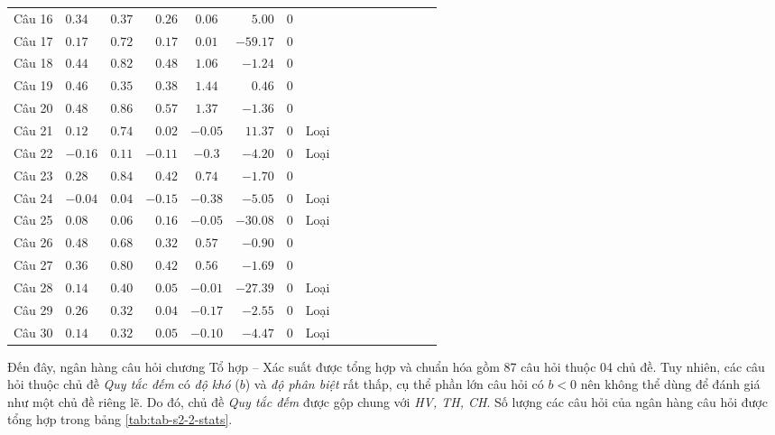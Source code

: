 \begin{longtable}{SlSrSrSrSrSrSrSc}
	Câu 16 & $0.34$  & $0.37$ & $0.26$  & $0.06$  & $5.00$   & $0$ &      \\
	Câu 17 & $0.17$  & $0.72$ & $0.17$  & $0.01$  & $-59.17$ & $0$ &      \\
	Câu 18 & $0.44$  & $0.82$ & $0.48$  & $1.06$  & $-1.24$  & $0$ &      \\
	Câu 19 & $0.46$  & $0.35$ & $0.38$  & $1.44$  & $0.46$   & $0$ &      \\
	Câu 20 & $0.48$  & $0.86$ & $0.57$  & $1.37$  & $-1.36$  & $0$ &      \\
	Câu 21 & $0.12$  & $0.74$ & $0.02$  & $-0.05$ & $11.37$  & $0$ & Loại \\
	Câu 22 & $-0.16$ & $0.11$ & $-0.11$ & $-0.3$  & $-4.20$  & $0$ & Loại \\
	Câu 23 & $0.28$  & $0.84$ & $0.42$  & $0.74$  & $-1.70$  & $0$ &      \\
	Câu 24 & $-0.04$ & $0.04$ & $-0.15$ & $-0.38$ & $-5.05$  & $0$ & Loại \\
	Câu 25 & $0.08$  & $0.06$ & $0.16$  & $-0.05$ & $-30.08$ & $0$ & Loại \\
	Câu 26 & $0.48$  & $0.68$ & $0.32$  & $0.57$  & $-0.90$  & $0$ &      \\
	Câu 27 & $0.36$  & $0.80$ & $0.42$  & $0.56$  & $-1.69$  & $0$ &      \\
	Câu 28 & $0.14$  & $0.40$ & $0.05$  & $-0.01$ & $-27.39$ & $0$ & Loại \\
	Câu 29 & $0.26$  & $0.32$ & $0.04$  & $-0.17$ & $-2.55$  & $0$ & Loại \\
	Câu 30 & $0.14$  & $0.32$ & $0.05$  & $-0.10$ & $-4.47$  & $0$ & Loại \\
\end{longtable}

Đến đây, ngân hàng câu hỏi chương Tổ hợp – Xác suất được tổng hợp và chuẩn hóa gồm 87 câu hỏi thuộc 04 chủ đề. Tuy nhiên, các câu hỏi thuộc chủ đề \textit{Quy tắc đếm} có \textit{độ khó} ($b$) và \textit{độ phân biệt} rất thấp, cụ thể phần lớn câu hỏi có $b<0$ nên không thể dùng để đánh giá như một chủ đề riêng lẽ. Do đó, chủ đề \textit{Quy tắc đếm} được gộp chung với \textit{HV, TH, CH}. Số lượng các câu hỏi của ngân hàng câu hỏi được tổng hợp trong bảng \ref{tab:tab-s2-2-stats}.\par

